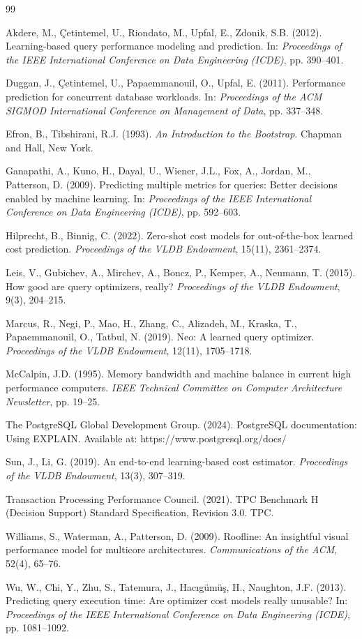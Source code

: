 \documentclass[runningheads]{llncs}
\begin{document}
\begin{thebibliography}{99}

Akdere, M., \c{C}etintemel, U., Riondato, M., Upfal, E., Zdonik, S.B. (2012).
Learning-based query performance modeling and prediction. In:
\emph{Proceedings of the IEEE International Conference on Data Engineering
(ICDE)}, pp. 390--401.

Duggan, J., \c{C}etintemel, U., Papaemmanouil, O., Upfal, E. (2011).
Performance prediction for concurrent database workloads. In:
\emph{Proceedings of the ACM SIGMOD International Conference on Management of
Data}, pp. 337--348.

Efron, B., Tibshirani, R.J. (1993). \emph{An Introduction to the Bootstrap}.
Chapman and Hall, New York.

Ganapathi, A., Kuno, H., Dayal, U., Wiener, J.L., Fox, A., Jordan, M.,
Patterson, D. (2009). Predicting multiple metrics for queries: Better
decisions enabled by machine learning. In: \emph{Proceedings of the IEEE
International Conference on Data Engineering (ICDE)}, pp. 592--603.

Hilprecht, B., Binnig, C. (2022). Zero-shot cost models for out-of-the-box
learned cost prediction. \emph{Proceedings of the VLDB Endowment}, 15(11),
2361--2374.

Leis, V., Gubichev, A., Mirchev, A., Boncz, P., Kemper, A., Neumann, T.
(2015). How good are query optimizers, really? \emph{Proceedings of the VLDB
Endowment}, 9(3), 204--215.

Marcus, R., Negi, P., Mao, H., Zhang, C., Alizadeh, M., Kraska, T.,
Papaemmanouil, O., Tatbul, N. (2019). Neo: A learned query optimizer.
\emph{Proceedings of the VLDB Endowment}, 12(11), 1705--1718.

McCalpin, J.D. (1995). Memory bandwidth and machine balance in current high
performance computers. \emph{IEEE Technical Committee on Computer
Architecture Newsletter}, pp. 19--25.

The PostgreSQL Global Development Group. (2024). PostgreSQL documentation:
Using EXPLAIN. Available at: https://www.postgresql.org/docs/

Sun, J., Li, G. (2019). An end-to-end learning-based cost estimator.
\emph{Proceedings of the VLDB Endowment}, 13(3), 307--319.

Transaction Processing Performance Council. (2021). TPC Benchmark H (Decision
Support) Standard Specification, Revision 3.0. TPC.

Williams, S., Waterman, A., Patterson, D. (2009). Roofline: An insightful
visual performance model for multicore architectures. \emph{Communications of
the ACM}, 52(4), 65--76.

Wu, W., Chi, Y., Zhu, S., Tatemura, J., Hac{\i}g\"{u}m\"{u}\c{s}, H.,
Naughton, J.F. (2013). Predicting query execution time: Are optimizer cost
models really unusable? In: \emph{Proceedings of the IEEE International
Conference on Data Engineering (ICDE)}, pp. 1081--1092.

\end{thebibliography}
\end{document}
